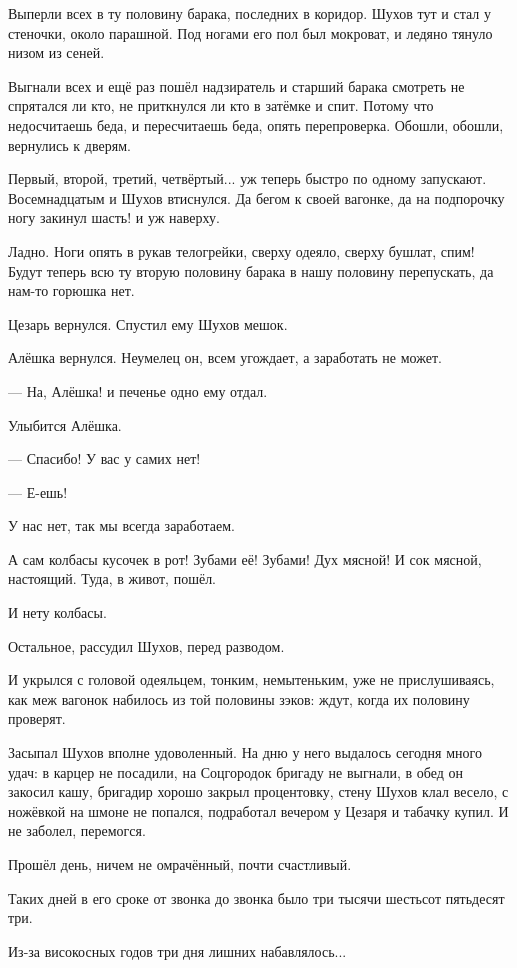 Выперли всех в ту половину барака, последних \dash в коридор. Шухов тут и стал у стеночки, около
парашной. Под ногами его пол был мокроват, и ледяно тянуло низом из сеней.

Выгнали всех \dash и ещё раз пошёл надзиратель и старший барака смотреть \dash не спрятался ли кто,
не приткнулся ли кто в затёмке и спит. Потому что недосчитаешь \dash беда, и пересчитаешь \dash беда,
опять перепроверка. Обошли, обошли, вернулись к дверям.

Первый, второй, третий, четвёртый... уж теперь быстро по одному запускают. Восемнадцатым и
Шухов втиснулся. Да бегом к своей вагонке, да на подпорочку ногу закинул \dash шасть! \dash и уж
наверху.

Ладно. Ноги опять в рукав телогрейки, сверху одеяло, сверху бушлат, спим! Будут теперь всю ту
вторую половину барака в нашу половину перепускать, да нам-то горюшка нет.

Цезарь вернулся. Спустил ему Шухов мешок.

Алёшка вернулся. Неумелец он, всем угождает, а заработать не может.

--- На, Алёшка! \dash и печенье одно ему отдал.

Улыбится Алёшка.

--- Спасибо! У вас у самих нет!

--- Е-ешь!

У нас нет, так мы всегда заработаем.

А сам колбасы кусочек \dash в рот! Зубами её! Зубами! Дух мясной! И сок мясной, настоящий. Туда, в
живот, пошёл.

И \dash нету колбасы.

Остальное, рассудил Шухов, перед разводом.

И укрылся с головой одеяльцем, тонким, немытеньким, уже не прислушиваясь, как меж вагонок
набилось из той половины зэков: ждут, когда их половину проверят.


Засыпал Шухов вполне удоволенный. На дню у него выдалось сегодня много удач: в карцер не
посадили, на Соцгородок бригаду не выгнали, в обед он закосил кашу, бригадир хорошо закрыл
процентовку, стену Шухов клал весело, с ножёвкой на шмоне не попался, подработал вечером у
Цезаря и табачку купил. И не заболел, перемогся.

Прошёл день, ничем не омрачённый, почти счастливый.


Таких дней в его сроке от звонка до звонка было три тысячи шестьсот пятьдесят три.

Из-за високосных годов \dash три дня лишних набавлялось...

\vfil\eject
\shipout\vbox{}
\shipout\vbox{}
\bye
